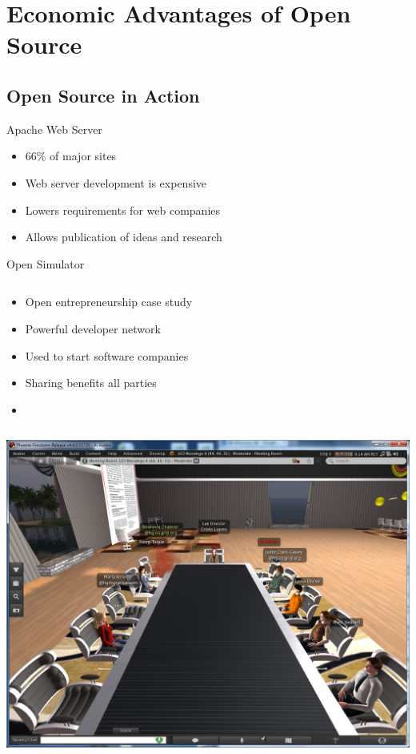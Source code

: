 \section{Economic Advantages of Open Source}\frame{\sectionpage}

\subsection{Open Source in Action}
\begin{frame}{Apache Web Server}
  \begin{itemize}
    \item 66\% of major sites~\cite[p~696]{powell}
    \item Web server development is expensive
    \item Lowers requirements for web companies
    \item Allows publication of ideas and research
  \end{itemize}
\end{frame}

\begin{frame}{Open Simulator}
  \begin{column}{0.45\textwidth}
    \begin{itemize}
      \item Open entrepreneurship case study
      \item Powerful developer network
      \item Used to start software companies
      \item Sharing benefits all parties
      \item\cite{yetis}
    \end{itemize}
  \end{column}
  \begin{column}{0.5\textwidth}\raggedleft{}
    \includegraphics[width=\textwidth]{images/opensim.jpg}
    \newline
    \caption{\Protect\cite{opensim}}
  \end{column}
\end{frame}

